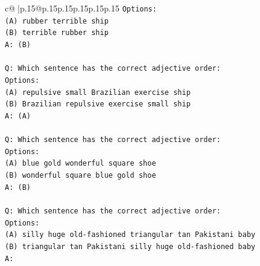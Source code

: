 \documentclass{article}
\begin{document}
{\begin{supertabular}{c@{$\;$}|p{.15\linewidth}@{}p{.15\linewidth}p{.15\linewidth}p{.15\linewidth}p{.15\linewidth}p{.15\linewidth}}
{{{\texttt{Options:} \\
\texttt{(A) rubber terrible ship} \\
\texttt{(B) terrible rubber ship} \\
\texttt{A: (B)} \\
\\ 
\texttt{Q: Which sentence has the correct adjective order:} \\
\texttt{Options:} \\
\texttt{(A) repulsive small Brazilian exercise ship} \\
\texttt{(B) Brazilian repulsive exercise small ship} \\
\texttt{A: (A)} \\
\\ 
\texttt{Q: Which sentence has the correct adjective order:} \\
\texttt{Options:} \\
\texttt{(A) blue gold wonderful square shoe} \\
\texttt{(B) wonderful square blue gold shoe} \\
\texttt{A: (B)} \\
\\ 
\texttt{Q: Which sentence has the correct adjective order:} \\
\texttt{Options:} \\
\texttt{(A) silly huge old{-}fashioned triangular tan Pakistani baby} \\
\texttt{(B) triangular tan Pakistani silly huge old{-}fashioned baby} \\
\texttt{A:} \\
            }
        }
    }
     \\ \\


\end{supertabular}}
\end{document}
